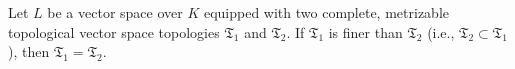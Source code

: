 Let $L$ be a vector space over $K$ equipped with two complete, metrizable topological vector space topologies $\mathfrak{T}_1$ and $\mathfrak{T}_2$. If $\mathfrak{T}_1$ is finer than $\mathfrak{T}_2$ (i.e., $\mathfrak{T}_2 \subset \mathfrak{T}_1$), then $\mathfrak{T}_1 = \mathfrak{T}_2$.
